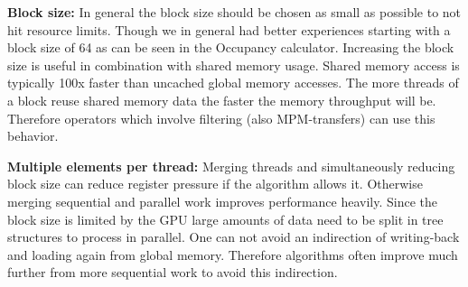 \documentclass[m,times]{cgMA}
\begin{document}
\textbf{Block size:} In general the block size should be chosen as small as possible to not hit resource limits. Though we in general had better experiences starting with a block size of 64 as can be seen in the Occupancy calculator. Increasing the block size is useful in combination with shared memory usage. Shared memory access is typically 100x faster than uncached global memory accesses. The more threads of a block reuse shared memory data the faster the memory throughput will be. Therefore operators which involve filtering (also MPM-transfers) can use this behavior.

\textbf{Multiple elements per thread:} Merging threads and simultaneously reducing block size can reduce register pressure if the algorithm allows it. Otherwise merging sequential and parallel work improves performance heavily. Since the block size is limited by the GPU large amounts of data need to be split in tree structures to process in parallel. One can not avoid an indirection of writing-back and loading again from global memory. Therefore algorithms often improve much further from more sequential work to avoid this indirection.
\begin{flushright}\cite{AMD:GPU_OPEN}\cite{NVIDIA:BEST:PRACTICE}\end{flushright}
\end{document}
